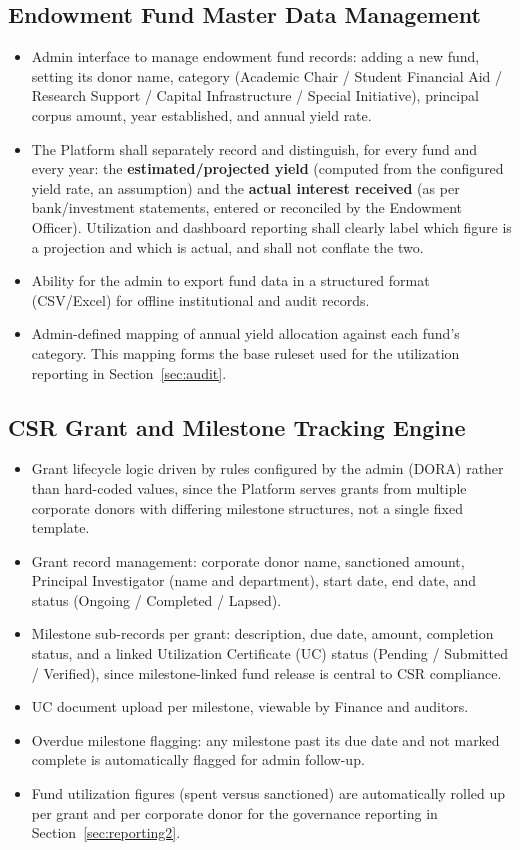 \documentclass[11pt]{article}
\begin{document}
\subsection{Endowment Fund Master Data Management}
\begin{itemize}[leftmargin=1.4em, itemsep=3pt]
\item Admin interface to manage endowment fund records: adding a new fund, setting its donor name, category (Academic Chair / Student Financial Aid / Research Support / Capital Infrastructure / Special Initiative), principal corpus amount, year established, and annual yield rate.
\item The Platform shall separately record and distinguish, for every fund and every year: the \textbf{estimated/projected yield} (computed from the configured yield rate, an assumption) and the \textbf{actual interest received} (as per bank/investment statements, entered or reconciled by the Endowment Officer). Utilization and dashboard reporting shall clearly label which figure is a projection and which is actual, and shall not conflate the two.
\item Ability for the admin to export fund data in a structured format (CSV/Excel) for offline institutional and audit records.
\item Admin-defined mapping of annual yield allocation against each fund's category. This mapping forms the base ruleset used for the utilization reporting in Section~\ref{sec:audit}.
\end{itemize}

\subsection{CSR Grant and Milestone Tracking Engine}
\begin{itemize}[leftmargin=1.4em, itemsep=3pt]
\item Grant lifecycle logic driven by rules configured by the admin (DORA) rather than hard-coded values, since the Platform serves grants from multiple corporate donors with differing milestone structures, not a single fixed template.
\item Grant record management: corporate donor name, sanctioned amount, Principal Investigator (name and department), start date, end date, and status (Ongoing / Completed / Lapsed).
\item Milestone sub-records per grant: description, due date, amount, completion status, and a linked Utilization Certificate (UC) status (Pending / Submitted / Verified), since milestone-linked fund release is central to CSR compliance.
\item UC document upload per milestone, viewable by Finance and auditors.
\item Overdue milestone flagging: any milestone past its due date and not marked complete is automatically flagged for admin follow-up.
\item Fund utilization figures (spent versus sanctioned) are automatically rolled up per grant and per corporate donor for the governance reporting in Section~\ref{sec:reporting2}.
\end{itemize}
\end{document}
